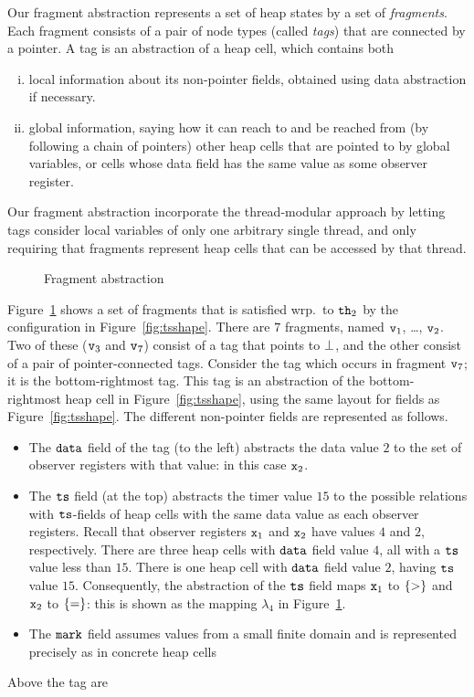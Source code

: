 Our fragment abstraction represents a set of heap states by
a set of {\em fragments}. Each fragment consists of
a pair of node types (called {\em tags}) that are connected by a pointer.
A tag is an abstraction of a heap cell, which contains both 
\begin{enumerate}[(i)]
\item
  local information about its non-pointer fields, obtained
   using data abstraction if necessary.
 \item
   global information, saying how
it can reach to and be reached from (by following a chain of pointers)
other heap cells that are pointed to by global variables, or cells whose
    data field has  the same value as some observer register.
\end{enumerate}
Our fragment abstraction incorporate the thread-modular approach by letting
tags consider local variables of only one arbitrary single thread, and
only requiring that fragments represent heap cells that can be accessed by
that thread.

\begin{figure}
	
\caption{Fragment abstraction}
\label{fig:tsviewshape}
\end{figure} 

Figure~\ref{fig:tsviewshape} shows a set of fragments that is
satisfied wrp.\ to ${\tt th}_2$ by the configuration in Figure~\ref{fig:tsshape}.
There are $7$ fragments, named $\mathtt{v}_1$, \ldots , $\mathtt{v}_2$. Two of
these ($\mathtt{v}_3$ and $\mathtt{v}_7$) consist of a tag that points to $\bot$,
and the other consist of a pair of pointer-connected tags.
Consider the tag which occurs in fragment $\mathtt{v}_7$; it is the bottom-rightmost
tag. This tag is an abstraction of the
bottom-rightmost heap cell in Figure~\ref{fig:tsshape}, using the same layout
for fields as Figure~\ref{fig:tsshape}. The different non-pointer fields
are represented as follows.
\begin{itemize}
\item The $\tt data$ field of the tag (to the left) abstracts the data value
  $2$ to the set of observer registers with that value: in this case
  $\mathtt{x}_2$.
\item The $\tt ts$ field (at the top) abstracts the timer value $15$ to
  the possible relations with $\tt ts$-fields of heap cells with the same
  data value as each observer registers. Recall that observer registers
  $\mathtt{x}_1$ and $\mathtt{x}_2$ have values $4$ and $2$, respectively. There are
  three heap cells with $\tt data$ field value $4$, all with a $\tt ts$
  value less than $15$. There is one heap cell with
  $\tt data$ field value $2$, having $\tt ts$ value $15$.
  Consequently, the abstraction of the $\tt ts$ field maps $\mathtt{x}_1$ to
  $\left\{>\right\}$ and $\mathtt{x}_2$ to $\left\{=\right\}$: this is shown as the mapping
  $\lambda_4$ in Figure~\ref{fig:tsviewshape}.
\item The $\tt mark$ field assumes values from a small finite domain and
  is represented precisely as in concrete heap cells
\end{itemize}
Above the tag are 

